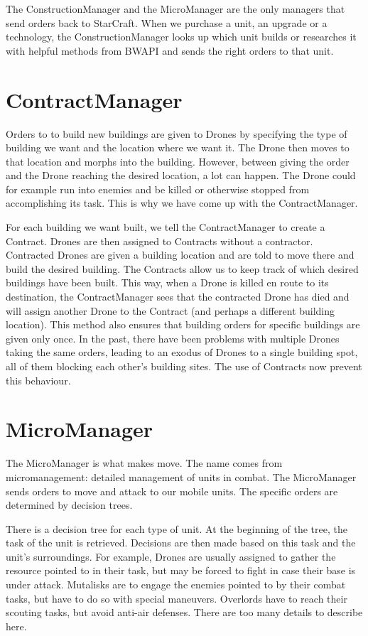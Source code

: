 The ConstructionManager and the MicroManager are the only managers that send orders back to StarCraft. When we purchase a unit, an upgrade or a technology, the ConstructionManager looks up which unit builds or researches it with helpful methods from BWAPI and sends the right orders to that unit.

\section{ContractManager}

Orders to to build new buildings are given to Drones by specifying the type of building we want and the location where we want it. The Drone then moves to that location and morphs into the building. However, between giving the order and the Drone reaching the desired location, a lot can happen. The Drone could for example run into enemies and be killed or otherwise stopped from accomplishing its task. This is why we have come up with the ContractManager.

For each building we want built, we tell the ContractManager to create a Contract. Drones are then assigned to Contracts without a contractor. Contracted Drones are given a building location and are told to move there and build the desired building. The Contracts allow us to keep track of which desired buildings have been built. This way, when a Drone is killed en route to its destination, the ContractManager sees that the contracted Drone has died and will assign another Drone to the Contract (and perhaps a different building location). This method also ensures that building orders for specific buildings are given only once. In the past, there have been problems with multiple Drones taking the same orders, leading to an exodus of Drones to a single building spot, all of them blocking each other's building sites. The use of Contracts now prevent this behaviour.

\section{MicroManager}

The MicroManager is what makes \massexpand move. The name comes from micromanagement: detailed management of units in combat. The MicroManager sends orders to move and attack to our mobile units. The specific orders are determined by decision trees.

There is a decision tree for each type of unit. At the beginning of the tree, the task of the unit is retrieved. Decisions are then made based on this task and the unit's surroundings. For example, Drones are usually assigned to gather the resource pointed to in their task, but may be forced to fight in case their base is under attack. Mutalisks are to engage the enemies pointed to by their combat tasks, but have to do so with special maneuvers. Overlords have to reach their scouting tasks, but avoid anti-air defenses. There are too many details to describe here.

